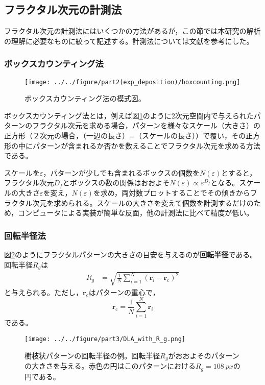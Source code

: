 \documentclass[autodetect-engine,dvi=dvipdfmx,a4paper,ja=standard,oneside,openany,11pt]{bxjsbook}
\begin{document}
\subsection{フラクタル次元の計測法}
フラクタル次元の計測法にはいくつかの方法があるが，この節では本研究の解析の理解に必要なものに絞って記述する。計測法については文献\cite{フラクタルの物理Ⅰ}を参考にした。
\subsubsection{ボックスカウンティング法}
\begin{figure}[htbp]
  \centering
  \texttt{[image: ../../figure/part2(exp\_deposition)/boxcounting.png]}
  \caption{ボックスカウンティング法の模式図\cite{表面粗さ曲線のフラクタル解析}。}
  \label{fig:box_counting}
\end{figure}

ボックスカウンティング法とは，例えば図\ref{fig:box_counting}のように2次元空間内で与えられたパターンのフラクタル次元を求める場合，パターンを様々なスケール（大きさ）の正方形（２次元の場合，（一辺の長さ）=（スケールの長さ））で覆い，その正方形の中にパターンが含まれるか否かを数えることでフラクタル次元を求める方法である。

スケールを$\varepsilon$，パターンが少しでも含まれるボックスの個数を$N(\varepsilon)$とすると，フラクタル次元$D_f$とボックスの数の関係はおおよそ$N(\varepsilon)\propto\varepsilon^{D_f}$となる。スケールの大きさ$\varepsilon$を変え，$N(\varepsilon)$を求め，両対数プロットすることでその傾きからフラクタル次元を求められる。スケールの大きさを変えて個数を計測するだけのため，コンピュータによる実装が簡単な反面，他の計測法に比べて精度が低い。
\subsubsection{回転半径法}
図\ref{fig:DLA_with_R_g}のようにフラクタルパターンの大きさの目安を与えるのが\textbf{回転半径}である。回転半径$R_g$は
\begin{align}
  R_g & =\sqrt{\frac{1}{N}\sum_{i=1}^{N}(\bm{r}_i-\bm{r}_{\mathrm{c}})^2}
  \label{eq:gyration_radius}
\end{align}
と与えられる。ただし，$\bm{r}_c$はパターンの重心で，
\begin{equation}
  \bm{r}_{\mathrm{c}}=\frac{1}{N}\sum_{i=1}^{N}\bm{r}_i
\end{equation}
である。

\begin{figure}[htbp]
  \centering
  \texttt{[image: ../../figure/part3/DLA\_with\_R\_g.png]}
  \caption{樹枝状パターンの回転半径の例。回転半径$R_g$がおおよそのパターンの大きさを与える。赤色の円はこのパターンにおける$R_g=\SI{108}{px}$の円である。}
  \label{fig:DLA_with_R_g}
\end{figure}
\end{document}
